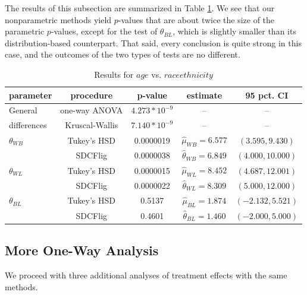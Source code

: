 \par \bigskip The results of this subsection are summarized in Table \ref{tab:aov1_results}. We see that our nonparametric methods yield $p$-values that are about twice the size of the parametric $p$-values, except for the test of $\theta_{BL}$, which is slightly smaller than its distribution-based counterpart. That said, every conclusion is quite strong in this case, and the outcomes of the two types of tests are no different. 

\vspace{.2in}

\begin{table}[h]
    \centering
    \begin{tabular}{|l|c|c|c|c|}
        \hline
        \textbf{parameter} & \textbf{procedure} & \textbf{p-value} & \textbf{estimate} & \textbf{95 pct. CI}\\
        \hline
        General & one-way ANOVA & $4.273*10^{-9}$ & -- & --\\
        differences & Kruscal-Wallis & $7.140*10^{-9}$  & -- & --\\
        \hline
        $\theta_{WB}$ & Tukey's HSD & 0.0000019 & $\hat{\mu}_{WB} = 6.577$ & $(3.595, 9.430)$\\
        & SDCFlig & 0.0000038 & $\hat{\theta}_{WB} = 6.849$ & $(4.000, 10.000)$\\
        \hline
        $\theta_{WL}$ & Tukey's HSD & 0.0000015 & $\hat{\mu}_{WL} = 8.452$ & $(4.687, 12.001)$\\
        & SDCFlig & 0.0000022 & $\hat{\theta}_{WL} = 8.309$ & $(5.000, 12.000)$\\
        \hline
        $\theta_{BL}$ & Tukey's HSD & 0.5137 & $\hat{\mu}_{BL} = 1.874$ & $(-2.132, 5.521)$\\
        & SDCFlig & 0.4601 & $\hat{\theta}_{BL} = 1.460$ & $(-2.000, 5.000)$\\
        \hline
    \end{tabular}
    \caption{Results for $age$ vs. $raceethnicity$}
    \label{tab:aov1_results}
\end{table}

\newpage

\subsection{More One-Way Analysis}

We proceed with three additional analyses of treatment effects with the same methods.

